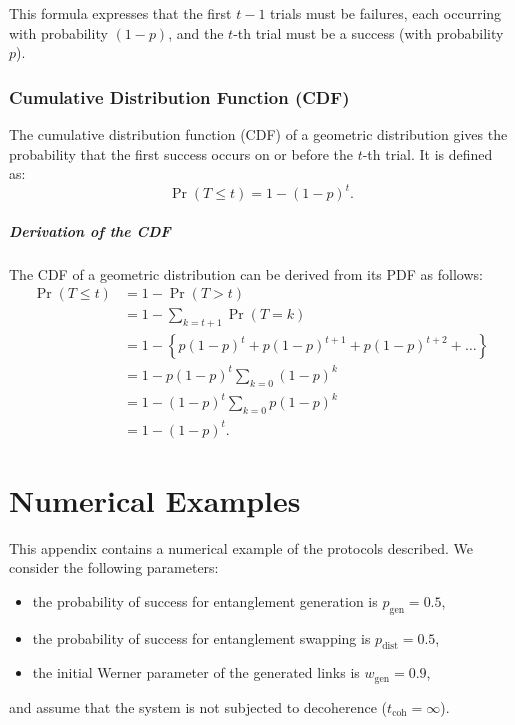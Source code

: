 \documentclass{masterthesis}
\begin{document}
This formula expresses that the first $t-1$ trials must be failures, each occurring with probability $(1-p)$, and the $t$-th trial must be a success (with probability $p$).

\subsection{Cumulative Distribution Function (CDF)}\label{subsection:geometric_cdf}

The cumulative distribution function (CDF) of a geometric distribution gives the probability that the first success occurs on or before the $t$-th trial. It is defined as:
\begin{equation}
    \Pr(T \leq t) = 1 - (1 - p)^t.
\end{equation}

\paragraph*{Derivation of the CDF}
The CDF of a geometric distribution can be derived from its PDF as follows:
\begin{align*}
    \Pr(T \leq t) &= 1 - \Pr(T > t) \\
    &= 1 - \sum_{k=t+1} \Pr(T = k) \\
    &= 1 - \left\{p (1 - p)^t + p (1 - p)^{t+1} + p (1 - p)^{t+2} + \ldots\right\} \\
    &= 1 - p (1 - p)^t \sum_{k=0} (1 - p)^k \\
    &= 1 - (1 - p)^t \sum_{k=0} p (1 - p)^k \\
    &= 1 - (1 - p)^t.
\end{align*} %

\chapter{Numerical Examples}\label{app:numerical_examples}
This appendix contains a numerical example of the protocols described. We consider the following parameters:
\begin{itemize}
    \item the probability of success for entanglement generation is $p_{\text{gen}} = 0.5$,
    \item the probability of success for entanglement swapping is $p_{\text{dist}} = 0.5$,
    \item the initial Werner parameter of the generated links is $w_{\text{gen}} = 0.9$,
\end{itemize}
and assume that the system is not subjected to decoherence ($t_\text{coh} = \infty$).
\end{document}
